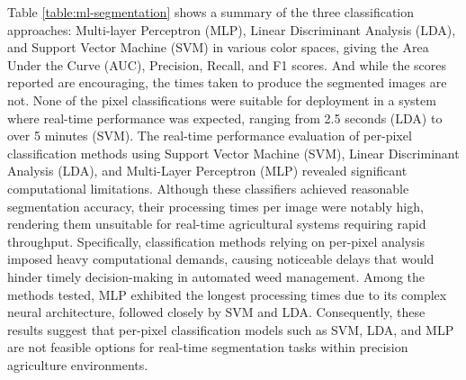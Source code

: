 \documentclass[agriculture,article,submit,pdftex,moreauthors]{Definitions/mdpi}
\begin{document}
Table \ref{table:ml-segmentation} shows a summary of the three classification approaches: Multi-layer Perceptron (MLP), Linear Discriminant Analysis (LDA), and Support Vector Machine (SVM) in various color spaces, giving the Area Under the Curve (AUC), Precision, Recall, and F1 scores. And while the scores reported are encouraging, the times taken to produce the segmented images are not. None of the pixel classifications were suitable for deployment in a system where real-time performance was expected, ranging from 2.5 seconds (LDA) to over 5 minutes (SVM).
The real-time performance evaluation of per-pixel classification methods using Support Vector Machine (SVM), Linear Discriminant Analysis (LDA), and Multi-Layer Perceptron (MLP) revealed significant computational limitations. Although these classifiers achieved reasonable segmentation accuracy, their processing times per image were notably high, rendering them unsuitable for real-time agricultural systems requiring rapid throughput. Specifically, classification methods relying on per-pixel analysis imposed heavy computational demands, causing noticeable delays that would hinder timely decision-making in automated weed management. Among the methods tested, MLP exhibited the longest processing times due to its complex neural architecture, followed closely by SVM and LDA. Consequently, these results suggest that per-pixel classification models such as SVM, LDA, and MLP are not feasible options for real-time segmentation tasks within precision agriculture environments.

\renewcommand*{\arraystretch}{1.1}

%
\end{document}
